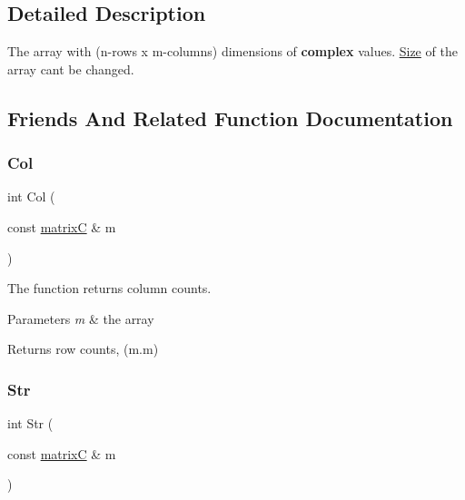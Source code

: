 \subsection{Detailed Description}
The array with (n-\/rows x m-\/columns) dimensions of {\bfseries complex} values. \mbox{\hyperlink{struct_size}{Size}} of the array can\textquotesingle{}t be changed. 

\subsection{Friends And Related Function Documentation}
\mbox{\label{classmatrix_c_a760a278d008e2717135156531da1450b}} 
\subsubsection{\texorpdfstring{Col}{Col}}
{\footnotesize\ttfamily int Col (\begin{DoxyParamCaption}\item[{const \mbox{\hyperlink{classmatrix_c}{matrixC}} \&}]{m }\end{DoxyParamCaption})\hspace{0.3cm}{\ttfamily [friend]}}



The function returns column counts. 


\begin{DoxyParams}{Parameters}
{\em m} & the array \\
\hline
\end{DoxyParams}
\begin{DoxyReturn}{Returns}
row counts, (m.\+m) 
\end{DoxyReturn}
\mbox{\label{classmatrix_c_a899bdb2aece2b65c6ef7b6fadf4a124b}} 
\subsubsection{\texorpdfstring{Str}{Str}}
{\footnotesize\ttfamily int Str (\begin{DoxyParamCaption}\item[{const \mbox{\hyperlink{classmatrix_c}{matrixC}} \&}]{m }\end{DoxyParamCaption})\hspace{0.3cm}{\ttfamily [friend]}}



